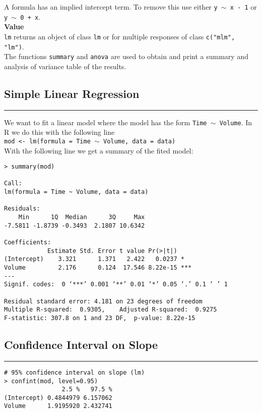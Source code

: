 A formula has an implied intercept term. To remove this use either \texttt{y $\sim$ x - 1} or \texttt{y $\sim$ 0 + x}.\\

\textbf{Value}\\
\texttt{lm} returns an object of class \texttt{lm} or for multiple responses of class \texttt{c("mlm", "lm")}.\\

The functions \texttt{summary} and \texttt{anova} are used to obtain and print a summary and analysis of variance table of the results.\\

\subsection{Simple Linear Regression}
\noindent\rule[\linienAbstand]{\linewidth}{\linienDicke}
We want to fit a linear model where the model has the form \texttt{Time $\sim$ Volume}. In R we do this with the following line\\
\texttt{mod <- lm(formula = Time $\sim$ Volume, data = data)}\\

With the following line we get a summary of the fited model:\\
\begingroup
\scriptsize
\begin{verbatim}
> summary(mod)

Call:
lm(formula = Time ~ Volume, data = data)

Residuals:
    Min      1Q  Median      3Q     Max
-7.5811 -1.8739 -0.3493  2.1807 10.6342

Coefficients:
            Estimate Std. Error t value Pr(>|t|)
(Intercept)    3.321      1.371   2.422   0.0237 *
Volume         2.176      0.124  17.546 8.22e-15 ***
---
Signif. codes:  0 ‘***’ 0.001 ‘**’ 0.01 ‘*’ 0.05 ‘.’ 0.1 ‘ ’ 1

Residual standard error: 4.181 on 23 degrees of freedom
Multiple R-squared:  0.9305,	Adjusted R-squared:  0.9275
F-statistic: 307.8 on 1 and 23 DF,  p-value: 8.22e-15
\end{verbatim}
\endgroup
\vspace{\baselineskip}

\subsection{Confidence Interval on Slope}
\noindent\rule[\linienAbstand]{\linewidth}{\linienDicke}
\begingroup
\scriptsize
\begin{verbatim}
# 95% confidence interval on slope (lm)
> confint(mod, level=0.95)
                2.5 %   97.5 %
(Intercept) 0.4844979 6.157062
Volume      1.9195920 2.432741
\end{verbatim}
\endgroup
\vspace{\baselineskip}

